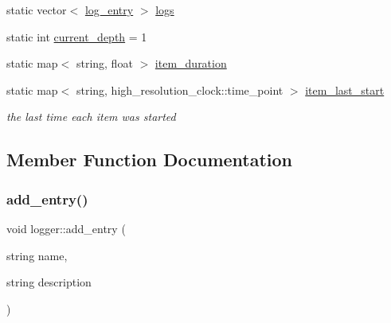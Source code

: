 \begin{DoxyCompactItemize}
static vector$<$ \hyperlink{classlog__entry}{log\+\_\+entry} $>$ \hyperlink{classlogger_a46e89697a97bc41a90ec78763bfe4d39}{logs}
\item 
static int \hyperlink{classlogger_a9d29b49bd318a719a8e85b59eac54fe0}{current\+\_\+depth} = 1
\item 
static map$<$ string, float $>$ \hyperlink{classlogger_a8097637b66086185096030c96a1189ba}{item\+\_\+duration}
\item 
static map$<$ string, high\+\_\+resolution\+\_\+clock\+::time\+\_\+point $>$ \hyperlink{classlogger_af21bf7ca37e55cf225b282ab2f312c95}{item\+\_\+last\+\_\+start}
\begin{DoxyCompactList}\small\item\em the last time each item was started \end{DoxyCompactList}\end{DoxyCompactItemize}


\subsection{Member Function Documentation}
\mbox{\label{classlogger_a710163deb17bc81f70d53d285b8ac9ac}} 
\subsubsection{\texorpdfstring{add\+\_\+entry()}{add\_entry()}}
{\footnotesize\ttfamily void logger\+::add\+\_\+entry (\begin{DoxyParamCaption}\item[{string}]{name,  }\item[{string}]{description }\end{DoxyParamCaption})\hspace{0.3cm}{\ttfamily [static]}}


